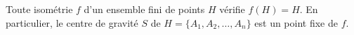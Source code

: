Toute isométrie $f$ d'un ensemble fini de points $H$ vérifie $f(H) = H$. En particulier, le centre de gravité $S$ de $H = \{A_1, A_2, \ldots, A_n\}$ est un point fixe de $f$.

